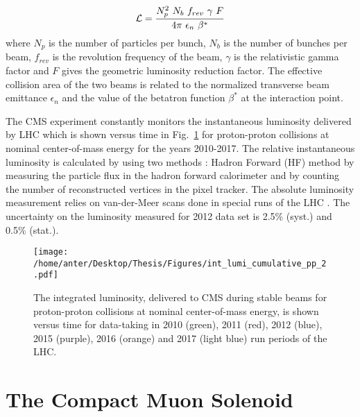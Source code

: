 \begin{equation}
\lumi = \frac{N^2_p~N_b~f_{rev}~\gamma~F}{4\pi~\epsilon_n~\beta^*}
\end{equation}
where $N_p$ is the number of particles per bunch, $N_b$ is the number of bunches per beam, $f_{rev}$ is the revolution frequency of the beam, $\gamma$ is the relativistic gamma factor and $F$ gives the geometric luminosity reduction factor. The effective collision area of the two beams is related to the normalized transverse beam emittance $\epsilon_n$ and the value of the betatron function $ \beta^*$ at the interaction point.
 
The CMS experiment constantly monitors the instantaneous luminosity delivered by LHC which is shown versus time in Fig.~\ref{fig:lumi} for proton-proton collisions at nominal center-of-mass energy for the years 2010-2017. The relative instantaneous luminosity is calculated by using two methods \cite{CMS:2013gfa} : Hadron Forward (HF) method by measuring the particle flux in the hadron forward calorimeter and by counting the number of reconstructed vertices in the pixel tracker. The absolute luminosity measurement relies on van-der-Meer scans done in special runs of the LHC \cite{vanderMeer:1968zz}. The uncertainty on the luminosity measured for 2012 data set is 2.5\% (syst.) and 0.5\% (stat.).

\begin{figure}[!h]
 \begin{center}
 \vspace*{4mm} 
 \texttt{[image: /home/anter/Desktop/Thesis/Figures/int\_lumi\_cumulative\_pp\_2.pdf]}\\
 \vspace*{5mm}
 \caption[Lumi]{The integrated luminosity, delivered to CMS during stable beams for proton-proton collisions at nominal center-of-mass energy, is shown versus time for data-taking in 2010 (green), 2011 (red), 2012 (blue), 2015 (purple), 2016 (orange) and 2017 (light blue) run periods of the LHC\footnotemark.}
 \label{fig:lumi}
 \end{center}
\end{figure}

\section{The Compact Muon Solenoid}

